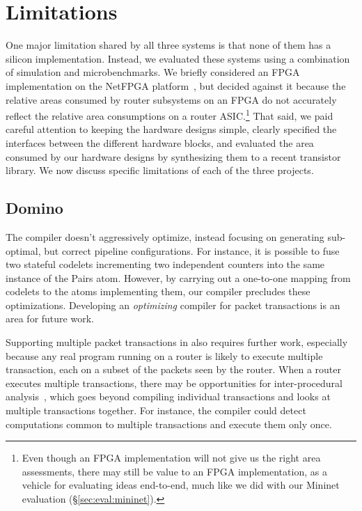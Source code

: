 \chapter{Limitations}
\label{chap:limitations}

One major limitation shared by all three systems is that none of them has a
silicon implementation. Instead, we evaluated these systems using a combination
of simulation and microbenchmarks. We briefly considered an FPGA implementation
on the NetFPGA platform~\cite{netfpga}, but decided against it because the
relative areas consumed by router subsystems on an FPGA do not accurately
reflect the relative area consumptions on a router ASIC.\footnote{ Even though
an FPGA implementation will not give us the right area assessments, there may
still be value to an FPGA implementation, as a vehicle for evaluating ideas
end-to-end, much like we did with our Mininet evaluation
(\S\ref{sec:eval:mininet}).} That said, we paid careful attention to keeping
the hardware designs simple, clearly specified the interfaces between the
different hardware blocks, and evaluated the area consumed by our hardware
designs by synthesizing them to a recent transistor library. We now discuss
specific limitations of each of the three projects.

\section{Domino}
\label{sec:domino_limitations}
The \pktlanguage compiler doesn't aggressively optimize, instead focusing on
generating sub-optimal, but correct pipeline configurations. For instance, it is
possible to fuse two stateful codelets incrementing two independent counters
into the same instance of the Pairs atom. However, by carrying out a one-to-one
mapping from codelets to the atoms implementing them, our compiler precludes
these optimizations.  Developing an {\em optimizing} compiler for packet
transactions is an area for future work.

Supporting multiple packet transactions in \pktlanguage also requires further
work, especially because any real program running on a router is likely to
execute multiple transaction, each on a subset of the packets seen by the
router. When a router executes multiple transactions, there may be
opportunities for inter-procedural analysis~\cite{dragonbook}, which goes
beyond compiling individual transactions and looks at multiple transactions
together.  For instance, the compiler could detect computations common to
multiple transactions and execute them only once.

